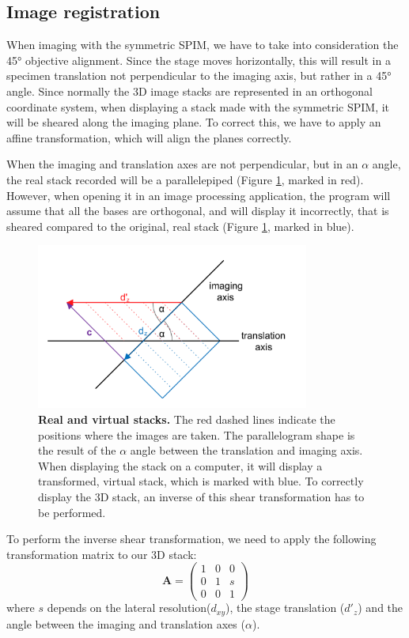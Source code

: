 \documentclass{tdk_style}
\begin{document}
\subsection{Image registration}
\label{affine}
When imaging with the symmetric SPIM, we have to take into consideration the 45° objective alignment. Since the stage moves horizontally, this will result in a specimen translation not perpendicular to the imaging axis, but rather in a 45° angle. Since normally the 3D image stacks are represented in an orthogonal coordinate system, when displaying a stack made with the symmetric SPIM, it will be sheared along the imaging plane. To correct this, we have to apply an affine transformation, which will align the planes correctly.

When the imaging and translation axes are not perpendicular, but in an $\alpha$ angle, the real stack recorded will be a parallelepiped (Figure \ref{fig:affine}, marked in red). However, when opening it in an image processing application, the program will assume that all the bases are orthogonal, and will display it incorrectly, that is sheared compared to the original, real stack (Figure \ref{fig:affine}, marked in blue).
\begin{figure}[htb]
	\centering
	\includegraphics[width=0.8\textwidth]{figures/2_spim/affine}
	\caption{\textbf{Real and virtual stacks.} The red dashed lines indicate the positions where the images are taken. The parallelogram shape is the result of the $\alpha$ angle between the translation and imaging axis. When displaying the stack on a computer, it will display a transformed, virtual stack, which is marked with blue. To correctly display the 3D stack, an inverse of this shear transformation has to be performed.}
	\label{fig:affine}
\end{figure}

To perform the inverse shear transformation, we need to apply the following transformation matrix to our 3D stack:
\begin{equation}
	\mathbf{A}=\begin{pmatrix}
		1 & 0 & 0 \\
		0 & 1 & s \\
		0 & 0 & 1
	\end{pmatrix}
\end{equation}
where $s$ depends on the lateral resolution($d_{xy}$), the stage translation ($d'_z$) and the angle between the imaging and translation axes ($\alpha$).
\end{document}
